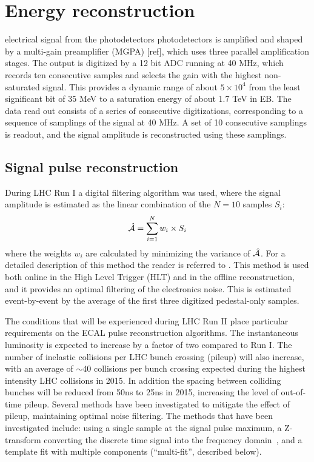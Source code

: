 \documentclass[journal]{IEEEtran}
\begin{document}
\section{Energy reconstruction}
\label{sec:energyreco}
 electrical signal from the photodetectors photodetectors is amplified and shaped by a multi-gain preamplifier (MGPA) [ref], which uses three parallel amplification stages. The output is digitized by a 12 bit ADC running at 40 MHz, which records ten consecutive samples and selects the gain with the highest non-saturated signal. This provides a dynamic range of about $5 \times 10^4$ from the least significant bit of 35 MeV to a saturation energy of about 1.7 TeV in EB. The data read out consists of a series of consecutive digitizations, corresponding to a sequence of samplings of the signal at 40 MHz. A set of 10 consecutive samplings is readout, and the signal amplitude is reconstructed using these samplings. 

\subsection{Signal pulse reconstruction}
\label{sec:amplitudereco}
During LHC Run I a digital filtering algorithm was used, where the signal amplitude is estimated as the linear combination of the $N=10$ samples $S_i$:
%
\begin{equation}
\hat{\cal A}=\sum_{i=1}^{N} w_i \times S_i
\end{equation}
%
where the weights $w_i$ are calculated by minimizing the variance of $\hat{\cal A}$. For a detailed description of this method the reader is referred to \cite{Bruneliere:2006ra}. This method is used both online in the High Level Trigger (HLT) and in the offline reconstruction, and it provides an optimal filtering of the electronics noise. This is estimated event-by-event by the average of the first three digitized pedestal-only samples.

The conditions that will be experienced during LHC Run II place particular requirements on the ECAL pulse reconstruction algorithms. The instantaneous luminosity is expected to increase by a factor of two compared to Run I. The number of inelastic collisions per LHC bunch crossing (pileup) will also increase, with an average of $\sim$40 collisions per bunch crossing expected during the highest intensity LHC collisions in 2015. In addition the spacing between colliding bunches will be reduced from 50ns to 25ns in 2015, increasing the level of out-of-time pileup. Several methods have been investigated to mitigate the effect of pileup, maintaining optimal noise filtering. The methods that have been investigated include: using a single sample at the signal pulse maximum, a Z-transform converting the discrete time signal into the frequency domain~\cite{Gadomski:1992xu}, and a template fit with multiple components (``multi-fit'', described below).  
\end{document}

